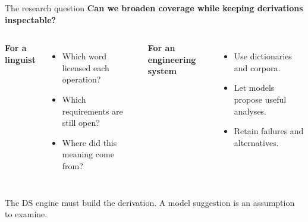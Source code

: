 \documentclass[aspectratio=169,11pt]{beamer}
\newcommand{\tagline}[1]{{\small\color{Accent}\bfseries #1}\par\medskip}
\newcommand{\keypoint}[1]{\begin{block}{}#1\end{block}}
\begin{document}
\begin{frame}{The research question}
  \color{Ink}
  \tagline{Can we broaden coverage while keeping derivations inspectable?}
  \begin{columns}[T,onlytextwidth]
      \textbf{For a linguist}\medskip
      \begin{itemize}\setlength\itemsep{7pt}
        \item Which word licensed each operation?
        \item Which requirements are still open?
        \item Where did this meaning come from?
      \end{itemize}
      \textbf{For an engineering system}\medskip
      \begin{itemize}\setlength\itemsep{7pt}
        \item Use dictionaries and corpora.
        \item Let models propose useful analyses.
        \item Retain failures and alternatives.
      \end{itemize}
  \end{columns}
  \vspace{5mm}
  \keypoint{The DS engine must build the derivation. A model suggestion is an assumption to examine.}
\end{frame}
\end{document}
